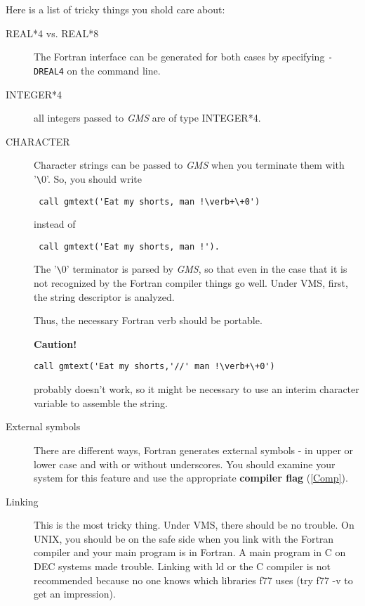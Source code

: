 Here is a list of tricky things you shold care about:
\begin{description}
\item[REAL*4 vs. REAL*8]\mbox{}

 The Fortran interface
can be generated for both cases by specifying
{\tt -DREAL4} on the command line.
\item[INTEGER*4]\mbox{}

 all integers passed to {\em GMS\/} are of type
INTEGER*4.
\item[CHARACTER]\mbox{}

 Character strings can be passed to {\em GMS\/}
when you terminate them with '\verb+\+0'. So,
you should write 
\begin{verbatim}
 call gmtext('Eat my shorts, man !\verb+\+0')
\end{verbatim}
 
instead of
\begin{verbatim}
 call gmtext('Eat my shorts, man !').
\end{verbatim}
 
                     
The  '\verb+\+0' terminator is parsed by {\em GMS\/},
so that even in the case that it is not recognized by the Fortran    
compiler things go well.
Under VMS, first, the string descriptor is analyzed.

Thus, the necessary Fortran verb should be portable.

{\bf Caution!}
\begin{verbatim}
call gmtext('Eat my shorts,'//' man !\verb+\+0')
\end{verbatim}
 probably
doesn't work, so it might be necessary to use an interim
character variable to assemble the string.

\item[External symbols]\mbox{}

 
There are different ways, Fortran generates external
symbols - in upper or lower case and with or without
underscores. You should examine your system for this 
feature and use the appropriate 
{\bf compiler flag} (\ref{Comp}).
\item[Linking]\mbox{}

 
This is the most tricky thing. Under VMS, there
should be no trouble. 
On UNIX, you should be 
on the safe side when you link with the Fortran compiler
and your main program is in Fortran. A main program in C
on DEC systems made trouble. Linking with ld or the
C compiler
is not recommended  because no one knows which 
libraries f77  uses (try f77 -v to get an impression). 

\end{description}



